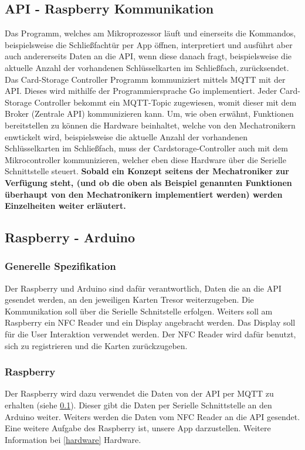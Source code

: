 \documentclass[a4paper]{article}
\begin{document}
\newpage

\subsection{API - Raspberry Kommunikation} \label{api-raspi-communication}
Das Programm, welches am Mikroprozessor läuft und einerseits die Kommandos, beispielsweise die Schließfachtür per App öffnen, interpretiert und ausführt aber auch andererseits Daten an die API, wenn diese danach fragt, beispielsweise die aktuelle Anzahl der vorhandenen Schlüsselkarten im Schließfach, zurücksendet. Das Card-Storage Controller Programm kommuniziert mittels MQTT mit der API. Dieses wird mithilfe der Programmiersprache Go implementiert. Jeder Card-Storage Controller bekommt ein MQTT-Topic zugewiesen, womit dieser mit dem Broker (Zentrale API) kommunizieren kann. Um, wie oben erwähnt, Funktionen bereitstellen zu können die Hardware beinhaltet, welche von den Mechatronikern enwtickelt wird, beispielsweise die aktuelle Anzahl der vorhandenen Schlüsselkarten im Schließfach, muss der Cardstorage-Controller auch mit dem Mikrocontroller kommunizieren, welcher eben diese Hardware über die Serielle Schnittstelle steuert. \textbf{Sobald ein Konzept seitens der Mechatroniker zur Verfügung steht, (und ob die oben als Beispiel genannten Funktionen überhaupt von den Mechatronikern implementiert werden) werden Einzelheiten weiter erläutert.}

\subsection{Raspberry - Arduino}
\subsubsection{Generelle Spezifikation}
Der Raspberry und Arduino sind dafür verantwortlich, Daten die an die API gesendet werden, an den jeweiligen Karten Tresor weiterzugeben. Die Kommunikation soll über die Serielle Schnitstelle erfolgen. Weiters soll am Raspberry ein NFC Reader und ein Display angebracht werden. Das Display soll für die User Interaktion verwendet werden. Der NFC Reader wird dafür benutzt, sich zu registrieren und die Karten zurückzugeben. 

\subsubsection{Raspberry}
Der Raspberry wird dazu verwendet die Daten von der API per MQTT zu erhalten (siehe \ref{api-raspi-communication}). Dieser gibt die Daten per Serielle Schnittstelle an den Arduino weiter. Weiters werden die Daten vom NFC Reader an die API gesendet. Eine weitere Aufgabe des Raspberry ist, unsere App darzustellen. Weitere Information bei \ref{hardware} Hardware.
\end{document}
